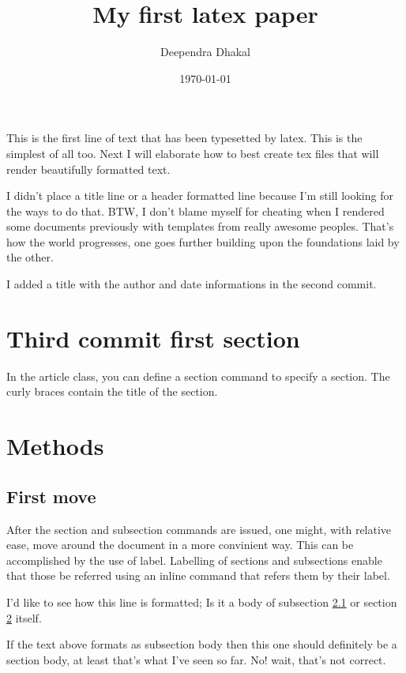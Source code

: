 \documentclass[a4paper,12pt]{article}
\begin{document}
\title{My first latex paper}
\author{Deependra Dhakal}
\date{\today}
\maketitle

\tableofcontents
\newpage
{}

This is the first line of text that has been typesetted by latex. This is the simplest of all too. Next I will elaborate how to best create tex files that will render beautifully formatted text.

I didn't place a title line or a header formatted line because I'm still looking for the ways to do that. BTW, I don't blame myself for cheating when I rendered some documents previously with templates from really awesome peoples. That's how the world progresses, one goes further building upon the foundations laid by the other.

I added a title with the author and date informations in the second commit.

\section{Third commit first section}
In the article class, you can define a section command to specify a section. The curly braces contain the title of the section.

\section{Methods}
\label{methods-sec}

\subsection{First move}
\label{first-method}
After the section and subsection commands are issued, one might, with relative ease, move around the document in a more convinient way. This can be accomplished by the use of label. Labelling of sections and subsections enable that those be referred using an inline command that refers them by their label.

I'd like to see how this line is formatted; Is it a body of subsection \ref{first-method} or section \ref{methods-sec} itself.

If the text above formats as subsection body then this one should definitely be a section body, at least that's what I've seen so far. No! wait, that's not correct. \
\end{document}
